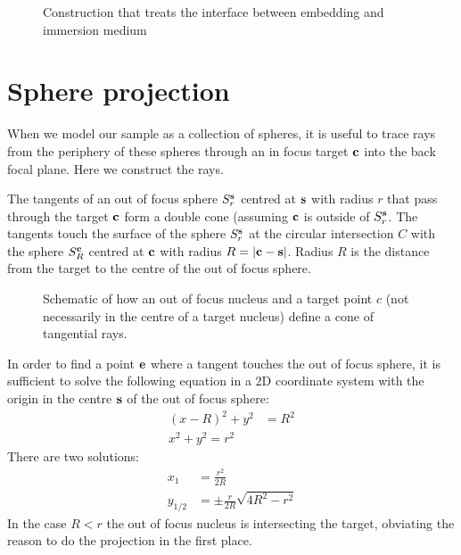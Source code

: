  \begin{figure}[!hbt]
   \centering
   
   \caption{Construction that treats the interface between embedding
     and immersion medium}
 \end{figure}
\section{Sphere projection}
\label{sec:sphere-projection}
When we model our sample as a collection of spheres, it is useful to
trace rays from the periphery of these spheres through an in focus
target $\mathbf{c}$ into the back focal plane. Here we construct the rays.

The tangents of an out of focus sphere $S^{\mathbf{s}}_r$ centred at $\mathbf{s}$ with
radius $r$ that pass through the target $\mathbf{c}$ form a double cone
(assuming $\mathbf{c}$ is outside of $S^{\mathbf{s}}_r$. The tangents touch the surface
of the sphere $S^{\mathbf{s}}_r$ at the circular intersection $C$ with the sphere
$S^{\mathbf{c}}_R$ centred at $\mathbf{c}$ with radius $R=\mathopen| \mathbf{c}-\mathbf{s} \mathclose|$. Radius $R$ is
the distance from the target to the centre of the out of focus sphere.
\begin{figure}[!hbt]
  \centering
  
  \caption{Schematic of how an out of focus nucleus and a target point
    $c$ (not necessarily in the centre of a target nucleus) define a
    cone of tangential rays.}
\end{figure}
In order to find a point $\mathbf{e}$ where a tangent touches the out of focus
sphere, it is sufficient to solve the following equation in a 2D
coordinate system with the origin in the centre $\mathbf{s}$ of the out of
focus sphere:
\begin{align}
  (x-R)^2+y^2&=R^2\\
  x^2+y^2=r^2
\end{align}
There are two solutions:
\begin{align}
  x_1&=\frac{r^2}{2R}\label{eqn:x1}\\ 
  y_{1/2}&=\pm\frac{r}{2R}\sqrt{4R^2-r^2} \label{eqn:y1}
\end{align}
In the case $R<r$ the out of focus nucleus is intersecting the target,
obviating the reason to do the projection in the first place.

